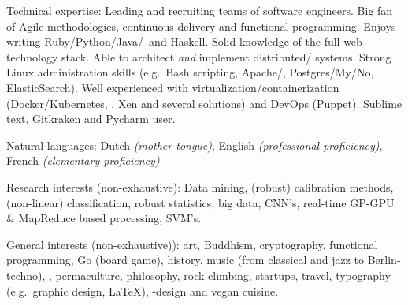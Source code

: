 \documentclass[10pt,a4paper]{article}
\begin{document}
\spacedhrule{1.6em}{-0.4em}


\inlineheadsection  %
{Technical expertise:}
{Leading and recruiting teams of software engineers.  Big fan of Agile methodologies, continuous delivery and functional programming.  Enjoys writing Ruby/\nsp Python/\nsp Java/\nsp \CPP~and Haskell.  Solid knowledge of the full web technology stack.  Able to architect \textit{and} implement distributed/ systems.  Strong Linux administration skills (e.g.\ Bash scripting, Apache/, Postgres/My/No, ElasticSearch).  Well experienced with virtualization/containerization (Docker/Kubernetes, , Xen and several  solutions) and DevOps (Puppet).  Sublime text, Gitkraken and Pycharm user.}

\vspace{0.5em}
\inlineheadsection
{Natural languages:}
{Dutch \emph{(mother tongue)}, English \emph{(professional proficiency)}, French \emph{(elementary proficiency)}}

\spacedhrule{1.6em}{-0.4em}


\inlineheadsection	
{Research interests (non-exhaustive):}
{Data mining, (robust) calibration methods, (non-linear) classification, robust statistics, big data, CNN's, real-time GP-GPU \& MapReduce based processing, SVM's.}

\inlineheadsection	
  {General interests (non-exhaustive)):}
  {art, Buddhism, cryptography, functional programming, Go (board game), history, music (from classical and jazz to Berlin-techno), , permaculture, philosophy, rock climbing, startups, travel, typography (e.g.\ graphic design, \LaTeX), -design and vegan cuisine.}
\end{document}
